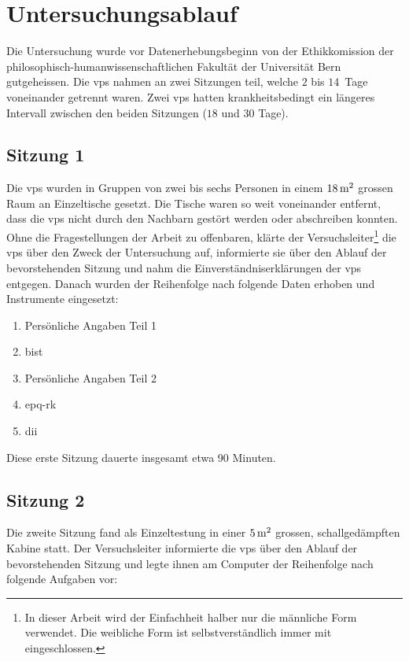 \documentclass[11pt, twoside, a4paper]{book}		%
\begin{document}
\section{Untersuchungsablauf \label{sec:Versuchsablauf}}

Die Untersuchung wurde vor Datenerhebungsbeginn von der Ethikkomission der philosophisch-humanwissenschaftlichen Fakultät der Universität Bern gutgeheissen. Die \glspl{vp} nahmen an zwei Sitzungen teil, welche $2$ bis $14$~Tage voneinander getrennt waren. Zwei \glspl{vp} hatten krankheitsbedingt ein längeres Intervall zwischen den beiden Sitzungen ($18$ und $30$ Tage).

\subsection{Sitzung 1}

Die \glspl{vp} wurden in Gruppen von zwei bis sechs Personen in einem $18\,\textnormal{m}^2$ grossen Raum an Einzeltische gesetzt. Die Tische waren so weit voneinander entfernt, dass die \glspl{vp} nicht durch den Nachbarn gestört werden oder abschreiben konnten. 
Ohne die Fragestellungen der Arbeit zu offenbaren, klärte der Versuchsleiter\footnote{In dieser Arbeit wird der Einfachheit halber nur die männliche Form verwendet. Die weibliche Form ist selbstverständlich immer mit eingeschlossen.} die \glspl{vp} über den Zweck der Untersuchung auf, informierte sie über den Ablauf der bevorstehenden Sitzung und nahm die Einverständniserklärungen der \glspl{vp} entgegen. Danach wurden der Reihenfolge nach folgende Daten erhoben und Instrumente eingesetzt:

\begin{enumerate}
	\item Persönliche Angaben Teil 1
	\item \acrshort{bist}
	\item Persönliche Angaben Teil 2
	\item \gls{epq-rk}
	\item \gls{dii}
\end{enumerate}

\noindent Diese erste Sitzung dauerte insgesamt etwa 90 Minuten.

\subsection{Sitzung 2}
Die zweite Sitzung fand als Einzeltestung in einer $5\,\textnormal{m}^2$ grossen, schallgedämpften Kabine statt. 
Der Versuchsleiter informierte die \glspl{vp} über den Ablauf der bevorstehenden Sitzung und legte ihnen am Computer der Reihenfolge nach folgende Aufgaben vor:
\end{document}
